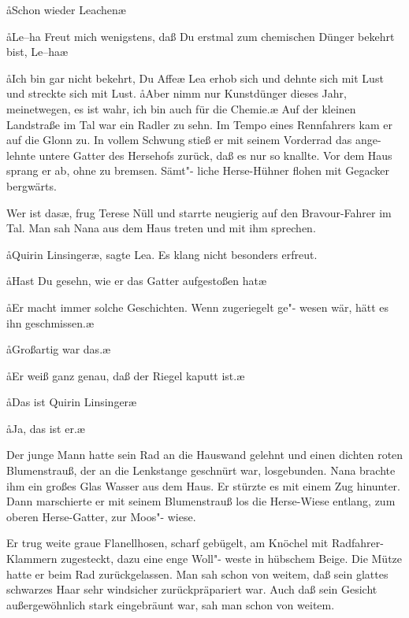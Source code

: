 \aa{}Schon wieder Leachen\ausr{}\ae{}

\aa{}Le--ha\ausr{} Freut mich wenigstens, daß Du erstmal zum
chemischen Dünger bekehrt bist, Le--ha\ausr{}\ae{}

\aa{}Ich bin gar nicht bekehrt, Du Affe\ausr{}\ae{} Lea erhob sich und
dehnte sich mit Lust und streckte sich mit Lust. \aa{}Aber nimm
nur Kunstdünger dieses Jahr, meinetwegen, es ist wahr, ich
bin auch für die Chemie.\ae{}
\abstand{}
Auf der kleinen Landstraße im Tal war ein Radler zu sehn.
Im Tempo eines Rennfahrers kam er auf die Glonn zu. In
vollem Schwung stieß er mit seinem Vorderrad das ange-%
lehnte untere Gatter des Hersehofs zurück, daß es nur so
knallte. Vor dem Haus sprang er ab, ohne zu bremsen. Sämt"-%
liche Herse-Hühner flohen mit Gegacker bergwärts.

\aanah{}Wer ist das\ae{}, frug Terese Nüll und starrte neugierig auf den
Bravour-Fahrer im Tal. Man sah Nana aus dem Haus treten
und mit ihm sprechen.

\aa{}Quirin Linsinger\ae{}, sagte Lea. Es klang nicht besonders erfreut.

\aa{}Hast Du gesehn, wie er das Gatter aufgestoßen hat\frag{}\ae{}

\aa{}Er macht immer solche Geschichten. Wenn zugeriegelt ge"-%
wesen wär, hätt es ihn geschmissen.\ae{}

\aa{}Großartig war das.\ae{}

\aa{}Er weiß ganz genau, daß der Riegel kaputt ist.\ae{}

\aa{}Das ist Quirin Linsinger\frag{}\ae{}

\aa{}Ja, das ist er.\ae{}

Der junge Mann hatte sein Rad an die Hauswand gelehnt
und einen dichten roten Blumenstrauß, der an die Lenkstange
geschnürt war, losgebunden. Nana brachte ihm ein großes
Glas Wasser aus dem Haus. Er stürzte es mit einem Zug
hinunter. Dann marschierte er mit seinem Blumenstrauß los\dopp{}
die Herse-Wiese entlang, zum oberen Herse-Gatter, zur Moos"-%
wiese.

Er trug weite graue Flanellhosen, scharf gebügelt, am Knöchel
mit Radfahrer-Klammern zugesteckt, dazu eine enge Woll"-%
weste in hübschem Beige. Die Mütze hatte er beim Rad
zurückgelassen. Man sah schon von weitem, daß sein glattes
schwarzes Haar sehr windsicher zurückpräpariert war. Auch
daß sein Gesicht außergewöhnlich stark eingebräunt war, sah
man schon von weitem.


